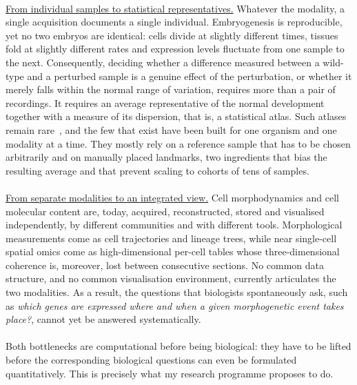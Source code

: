 \paragraph{}\underline{From individual samples to statistical representatives.}
Whatever the modality, a single acquisition documents a single individual.
Embryogenesis is reproducible, yet no two embryos are identical: cells divide at slightly different times, tissues fold at slightly different rates and expression levels fluctuate from one sample to the next.
Consequently, deciding whether a difference measured between a wild-type and a perturbed sample is a genuine effect of the perturbation, or whether it merely falls within the normal range of variation, requires more than a pair of recordings.
It requires an average representative of the normal development together with a measure of its dispersion, that is, a statistical atlas.
Such atlases remain rare~\cite{Wolff:2018aa,McDole:2018aa,Li2019,Guignard2020,Leroy2026}, and the few that exist have been built for one organism and one modality at a time.
They mostly rely on a reference sample that has to be chosen arbitrarily and on manually placed landmarks, two ingredients that bias the resulting average and that prevent scaling to cohorts of tens of samples.
\paragraph{}\underline{From separate modalities to an integrated view.}
Cell morphodynamics and cell molecular content are, today, acquired, reconstructed, stored and visualised independently, by different communities and with different tools.
Morphological measurements come as cell trajectories and lineage trees, while near single-cell spatial omics come as high-dimensional per-cell tables whose three-dimensional coherence is, moreover, lost between consecutive sections.
No common data structure, and no common visualisation environment, currently articulates the two modalities.
As a result, the questions that biologists spontaneously ask, such as \emph{which genes are expressed where and when a given morphogenetic event takes place?}, cannot yet be answered systematically.
\paragraph{}Both bottlenecks are computational before being biological: they have to be lifted before the corresponding biological questions can even be formulated quantitatively.
This is precisely what my research programme proposes to do.
